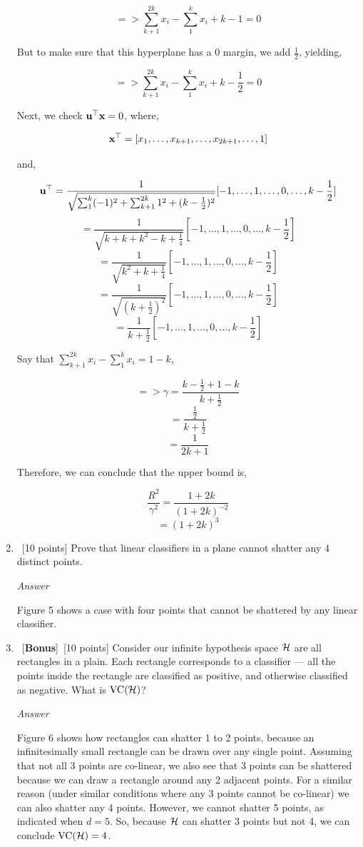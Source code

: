 \documentclass[12pt, fullpage,letterpaper]{article}
\begin{document}
\begin{enumerate}
	\[
	    => \sum_{k+1}^{2k} x_i - \sum_{1}^{k} x_i + k - 1 = 0
	\]
	
	But to make sure that this hyperplane has a 0 margin, we add $\frac{1}{2}$, yielding,
	
	\[
	    => \sum_{k+1}^{2k} x_i - \sum_{1}^{k} x_i + k - \frac{1}{2} = 0
	\]
	
	Next, we check ${\bf u}^\top{\bf x} = 0$, where,
	
	\[
	    {\bf x}^\top = [x_1, \hdots, x_{k+1}, \hdots, x_{2k+1}, \hdots, 1]
	\]
	
	and,
	
	\[
	    {\bf u}^\top = \frac{1}{\sqrt{\sum_{1}^{k} (-1)^2 + \sum_{k+1}^{2k} 1^2 + (k-\frac{1}{2})^2}} [-1, \hdots, 1, \hdots, 0, \hdots, k - \frac{1}{2}]
	\]
	\[
	    = \frac{1}{\sqrt{ k + k + k^2 - k + \frac{1}{4} } } [-1, \hdots, 1, \hdots, 0, \hdots, k - \frac{1}{2}]
	\]
	\[
	    = \frac{1}{\sqrt{ k^2 + k + \frac{1}{4} } } [-1, \hdots, 1, \hdots, 0, \hdots, k - \frac{1}{2}]
	\]
	\[
	    = \frac{1}{\sqrt{ (k + \frac{1}{2})^2 } } [-1, \hdots, 1, \hdots, 0, \hdots, k - \frac{1}{2}]
	\]
	\[
	    = \frac{1}{ k + \frac{1}{2} } [-1, \hdots, 1, \hdots, 0, \hdots, k - \frac{1}{2}]
	\]
	
	Say that $\sum_{k+1}^{2k} x_i - \sum_{1}^{k} x_i = 1 - k$,
	
	\[
	    => \gamma = \frac{ k - \frac{1}{2} + 1 - k }{ k + \frac{1}{2} }
	\]
	\[
	    = \frac{ \frac{1}{2} }{ k + \frac{1}{2} }
	\]
	\[
	    = \frac{ 1 }{ 2k + 1 }
	\]
	
	Therefore, we can conclude that the upper bound is,
	
	\[
	    \frac{R^2}{\gamma^2} = \frac{ 1 + 2k }{ (1 + 2k)^{-2} }
	\]
	\[
	    = (1 + 2k)^3
	\]

	\item~[10 points] Prove that linear classifiers in a plane cannot shatter any $4$ distinct points. 
	
	\emph{Answer}
	
	Figure 5 shows a case with four points that cannot be shattered by any linear classifier.
	
	\item~[\textbf{Bonus}]~[10 points] Consider our infinite hypothesis space $\mathcal{H}$ are all rectangles in a plain. Each rectangle corresponds to a classifier --- all the points inside the rectangle are classified as positive, and otherwise classified as negative. What is $\mathrm{VC}(\mathcal{H})$?
	
	\emph{Answer}
	
	Figure 6 shows how rectangles can shatter 1 to 2 points, because an infinitesimally small rectangle can be drawn over any single point. Assuming that not all 3 points are co-linear, we also see that 3 points can be shattered because we can draw a rectangle around any 2 adjacent points. For a similar reason (under similar conditions where any 3 points cannot be co-linear) we can also shatter any 4 points. However, we cannot shatter 5 points, as indicated when $d=5$. So, because $\mathcal{H}$ can shatter 3 points but not 4, we can conclude $\mathrm{VC}(\mathcal{H})=4$.
	

\end{enumerate}
\end{document}
